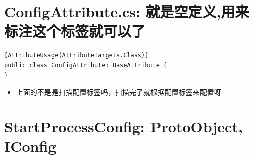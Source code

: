 \documentclass[9pt, b5paper]{article}
\begin{document}
\section{ConfigAttribute.cs: 就是空定义,用来标注这个标签就可以了}
\label{sec-15}
\begin{verbatim}
[AttributeUsage(AttributeTargets.Class)]
public class ConfigAttribute: BaseAttribute {
}
\end{verbatim}
\begin{itemize}
\item 上面的不是是扫描配置标签吗，扫描完了就根据配置标签来配置呀
\end{itemize}
\section{StartProcessConfig: ProtoObject, IConfig}
\label{sec-16}
\end{document}
